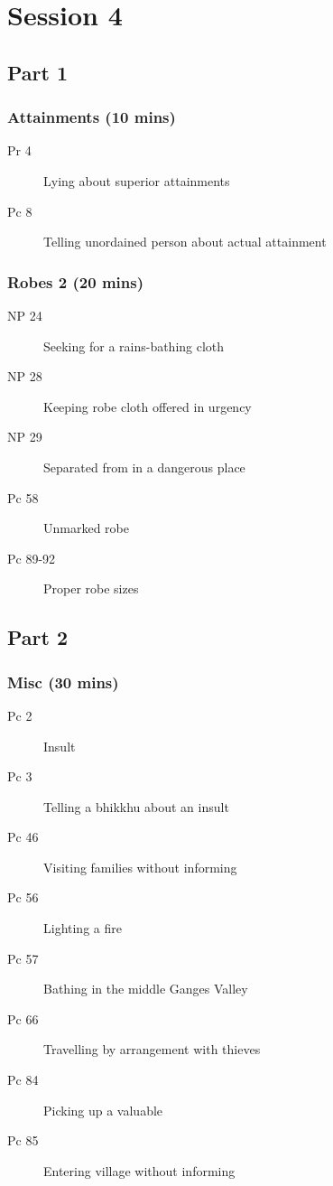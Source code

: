 \documentclass[11pt,oneside]{memoir}
\begin{document}
\chapter{Session 4}

\begin{multicols}{2}

\section{Part 1}

\subsection{Attainments (10 mins)}

\begin{description}
\item[Pr 4] Lying about superior attainments
\item[Pc 8] Telling unordained person about actual attainment
\end{description}

\subsection{Robes 2 (20 mins)}

\begin{description}
\item[NP 24] Seeking for a rains-bathing cloth
\item[NP 28] Keeping robe cloth offered in urgency
\item[NP 29] Separated from in a dangerous place
\item[Pc 58] Unmarked robe
\item[Pc 89-92] Proper robe sizes
\end{description}

\columnbreak

\section{Part 2}

\subsection{Misc (30 mins)}

\begin{description}
\item[Pc 2] Insult
\item[Pc 3] Telling a bhikkhu about an insult
\item[Pc 46] Visiting families without informing
\item[Pc 56] Lighting a fire
\item[Pc 57] Bathing in the middle Ganges Valley
\item[Pc 66] Travelling by arrangement with thieves
\item[Pc 84] Picking up a valuable
\item[Pc 85] Entering village without informing
\end{description}

\end{multicols}
\end{document}
